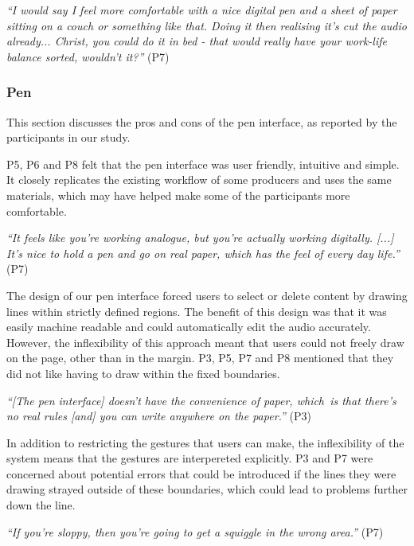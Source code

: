 \textit{``I would say I feel more comfortable with a nice digital pen and a sheet of paper sitting on a couch or
something like that. Doing it then realising it's cut the audio already... Christ, you could do it in bed - that would
really have your work-life balance sorted, wouldn't it?''} (P7)

\subsubsection{Pen}

This section discusses the pros and cons of the pen interface, as reported by the participants in our study.


P5, P6 and P8 felt that the pen interface was user friendly, intuitive and simple. It closely replicates the existing
workflow of some producers and uses the same materials, which may have helped make some of the participants more
comfortable.

\textit{``It feels like you're working analogue, but you're actually working digitally. [...] It's nice to hold a pen
and go on real paper, which has the feel of every day life.''} (P7)


The design of our pen interface forced users to select or delete content by drawing lines within strictly defined
regions. The benefit of this design was that it was easily machine readable and could automatically edit the audio
accurately. However, the inflexibility of this approach meant that users could not freely draw on the page, other than
in the margin. P3, P5, P7 and P8 mentioned that they did not like having to draw within the fixed boundaries.

\textit{``[The pen interface] doesn't have the convenience of paper, which is that there's no real rules [and] you can
write anywhere on the paper.''} (P3)

In addition to restricting the gestures that users can make, the inflexibility of the system means that the gestures
are interpereted explicitly. P3 and P7 were concerned about potential errors that could be introduced if the lines they
were drawing strayed outside of these boundaries, which could lead to problems further down the line.

\textit{``If you're sloppy, then you're going to get a squiggle in the wrong area.''} (P7)

